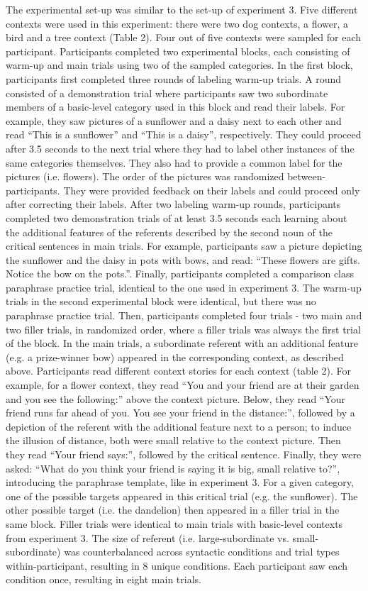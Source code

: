 The experimental set-up was similar  to the set-up of experiment 3. Five different contexts were used in this experiment: there were two dog contexts, a flower, a bird and a tree context (Table 2). Four out of five contexts were sampled for each participant.  Participants completed two experimental blocks, each consisting of warm-up and main trials using two of the sampled categories. In the first block, participants first completed three rounds of labeling warm-up trials. A round consisted of a demonstration trial where participants saw two subordinate members of a basic-level category used in this block and read their labels. For example, they saw pictures of a sunflower and a daisy next to each other and read “This is a sunflower” and “This is a daisy”, respectively. They could proceed after 3.5 seconds to the next trial where they had to label other instances of the same categories themselves. They also had to provide a common label for the pictures (i.e. flowers). The order of the pictures was randomized between-participants. They were provided feedback on their labels and could proceed only after correcting their labels.  After two labeling warm-up rounds, participants completed two demonstration trials of at least 3.5 seconds each learning about the additional features of the referents described by the second noun of the critical sentences in main trials. For example, participants saw a picture depicting the sunflower and the daisy in pots with bows, and read: “These flowers are gifts. Notice the bow on the pots.”. Finally, participants completed a comparison class paraphrase practice trial, identical to the one used in experiment 3. The warm-up trials in the second experimental block were identical, but there was no paraphrase practice trial.   
Then, participants completed four trials - two main and two filler trials, in randomized order, where a filler trials was always the first trial of the block. In the main trials, a subordinate referent with an additional feature (e.g. a prize-winner bow) appeared in the corresponding context, as described above. Participants read different context stories for each context (table 2).  For example, for a flower context, they read “You and your friend are at their garden and you see the following:” above the context picture. Below, they read “Your friend runs far ahead of you. You see your friend in the distance:”, followed by a depiction of the referent with the additional feature next to a person; to induce the illusion of distance, both were small relative to the context picture. Then they read “Your friend says:”, followed by the critical sentence. Finally, they were asked: “What do you think your friend is saying it is {big, small} relative to?”, introducing the paraphrase template, like in experiment 3. For a given category, one of the possible targets appeared in this critical trial (e.g. the sunflower). The other possible target (i.e. the dandelion) then appeared in a filler trial in the same block. Filler trials were identical to main trials with basic-level contexts from experiment 3. The size of referent (i.e. large-subordinate vs. small-subordinate) was counterbalanced across syntactic conditions and trial types within-participant, resulting in 8 unique conditions. Each participant saw each condition once, resulting in eight main trials.

